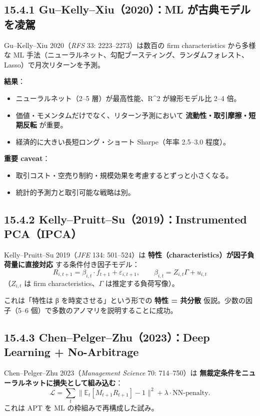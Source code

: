 \documentclass[11pt,a4paper]{report}
\begin{document}
\subsection{15.4.1 Gu–Kelly–Xiu（2020）：ML が古典モデルを凌駕}

Gu–Kelly–Xiu 2020（\emph{RFS} 33: 2223–2273）は数百の firm characteristics から多様な ML 手法（ニューラルネット、勾配ブースティング、ランダムフォレスト、Lasso）で月次リターンを予測。

\textbf{結果}：
\begin{itemize}
\item ニューラルネット（2–5 層）が最高性能、R\textasciicircum{}2 が線形モデル比 2–4 倍。
\item 価値・モメンタムだけでなく、リターン予測において \textbf{流動性・取引摩擦・短期反転} が重要。
\item 経済的に大きい長短ロング・ショート Sharpe（年率 2.5–3.0 程度）。
\end{itemize}

\textbf{重要 caveat}：
\begin{itemize}
\item 取引コスト・空売り制約・規模効果を考慮するとずっと小さくなる。
\item 統計的予測力と取引可能な戦略は別。
\end{itemize}

\subsection{15.4.2 Kelly–Pruitt–Su（2019）：Instrumented PCA（IPCA）}

Kelly–Pruitt–Su 2019（\emph{JFE} 134: 501–524）は \textbf{特性（characteristics）が因子負荷量に直接対応} する条件付き因子モデル： \[ R_{i,t+1} = \beta_{i,t} \cdot f_{t+1} + \varepsilon_{i,t+1}, \qquad \beta_{i,t} = Z_{i,t} \Gamma + u_{i,t} \] （$Z_{i,t}$ は firm characteristics、$\Gamma$ は推定する負荷写像）。

これは「特性は β を時変させる」という形での \textbf{特性 = 共分散} 仮説。少数の因子（5–6 個）で多数のアノマリを説明することに成功。

\subsection{15.4.3 Chen–Pelger–Zhu（2023）：Deep Learning + No-Arbitrage}

Chen–Pelger–Zhu 2023（\emph{Management Science} 70: 714–750）は \textbf{無裁定条件をニューラルネットに損失として組み込む}： \[ \mathcal{L} = \sum_t \| \mathbb{E}_t[M_{t+1} R_{t+1}] - 1 \|^2 + \lambda \cdot \mathrm{NN\text{-}penalty}. \] これは APT を ML の枠組みで再構成した試み。
\end{document}
